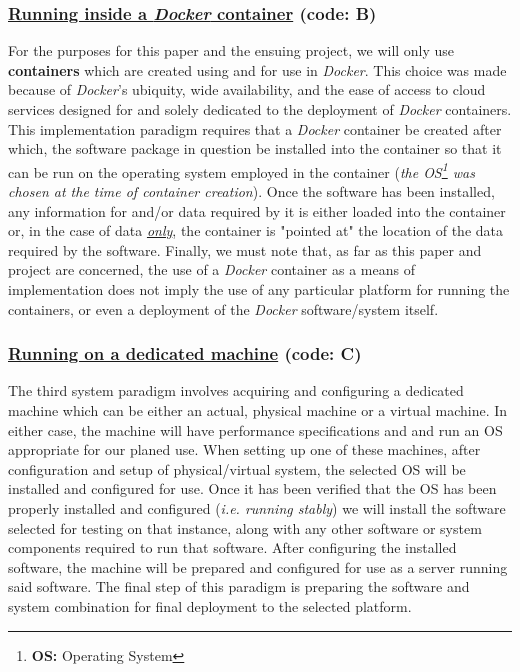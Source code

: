\documentclass{article}[12pt]
\numberwithin{equation}{section}
\begin{document}
\begin{flushleft}
\subsubsection{\underline{Running inside a \emph{Docker} container} (code: \textbf{B}) }
\begin{spacing}{1.5}
	For the purposes for this paper and the ensuing project, we will only use \textbf{containers} which are created using and for use in \emph{Docker}.  This choice was made because of \emph{Docker}'s ubiquity, wide availability, and the ease of access to cloud services designed for and solely dedicated to the deployment of \emph{Docker} containers.  This implementation paradigm requires that a \emph{Docker} container be created after which, the software package in question be installed into the container so that it can be run on the operating system employed in the container (\emph{the OS\footnote{\textbf{OS: } Operating System} was chosen at the time of container creation}). Once the software has been installed, any information for and/or data required by it is either loaded into the container or, in the case of data \underline{\emph{only}}, the container is "pointed at" the location of the data required by the software.  Finally, we must note that, as far as this paper and project are concerned, the use of a \emph{Docker} container as a means of implementation does not imply the use of any particular platform for running the containers, or even a deployment of the \emph{Docker} software/system itself. 
\end{spacing}


\subsubsection{\underline{Running on a dedicated machine} (code: \textbf{C}) }
\begin{spacing}{1.5}
	The third system paradigm involves acquiring and configuring a dedicated machine which can be either an actual, physical machine or a virtual machine.  In either case, the machine will have performance specifications and and run an OS appropriate for our planed use.  When setting up one of these machines, after configuration and setup of physical/virtual system, the selected OS will be installed and configured for use.  Once it has been verified that the OS has been properly installed and configured (\emph{i.e. running stably}) we will install the software selected for testing on that instance, along with any other software or system components required to run that software.  After configuring the installed software, the machine will be prepared and configured for use as a server running said software.  The final step of this paradigm is preparing the software and system combination for final deployment to the selected platform.
\end{spacing}




\end{flushleft}
\end{document}
